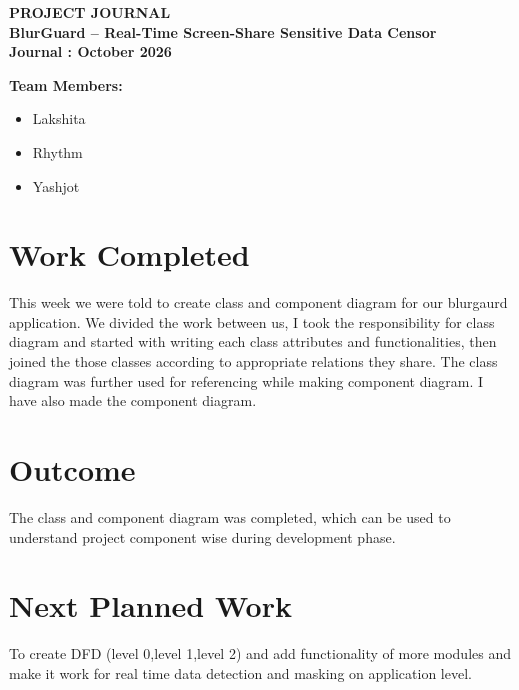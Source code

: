 \documentclass[12pt,a4paper]{article}
\begin{document}
\begin{center}
    {\Large\bfseries PROJECT JOURNAL}\\[10pt]
    {\large\bfseries BlurGuard -- Real-Time Screen-Share Sensitive Data Censor}\\[10pt]
    {\bfseries Journal : October 2026}
\end{center}

\vspace{6pt}

\textbf{Team Members:}
\begin{itemize}[topsep=2pt,itemsep=0pt]
    \item Lakshita
    \item Rhythm
    \item Yashjot
\end{itemize}

\section*{Work Completed}
This week we were told to create class and component diagram for our blurgaurd application. We divided the work between us, I took the responsibility for class diagram and started with writing each class attributes and functionalities, then joined the those classes according to appropriate relations they share. The class diagram was further used for referencing while making component diagram. I have also made the component diagram.

\section*{Outcome}
The class and component diagram was completed, which can be used to understand project component wise during development phase.

\section*{Next Planned Work}
To create DFD (level 0,level 1,level 2) and add functionality of more modules and make it work for real time data detection and masking on application level.
\end{document}
